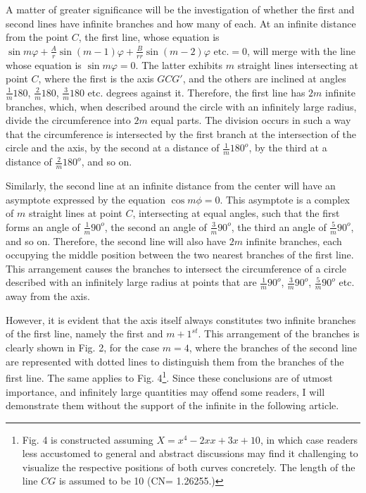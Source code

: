 \documentclass[12pt]{memoir}
\theoremstyle{plain}
\theoremstyle{remark}
\begin{document}
A matter of greater significance will be the investigation of whether the first and second lines have infinite branches and how many of each. At an infinite distance from the point \(C\), the first line, whose equation is \(\sin m \varphi + \frac{A}{r} \sin (m-1)\varphi + \frac{B}{rr} \sin (m-2) \varphi \text{ etc.} = 0\), will merge with the line whose equation is \(\sin m \varphi = 0\). The latter exhibits \(m\) straight lines intersecting at point \(C\), where the first is the axis \(GCG'\), and the others are inclined at angles \(\frac{1}{m} 180\), \(\frac{2}{m} 180\), \(\frac{3}{m} 180 \) etc. degrees against it. Therefore, the first line has \(2m\) infinite branches, which, when described around the circle with an infinitely large radius, divide the circumference into \(2m\) equal parts. The division occurs in such a way that the circumference is intersected by the first branch at the intersection of the circle and the axis, by the second at a distance of \(\frac{1}{m} 180^o\), by the third at a distance of \(\frac{2}{m} 180^o\), and so on.

Similarly, the second line at an infinite distance from the center will have an asymptote expressed by the equation \(\cos m \phi = 0\). This asymptote is a complex of \(m\) straight lines at point \(C\), intersecting at equal angles, such that the first forms an angle of \(\frac{1}{m}90^o\), the second an angle of \(\frac{3}{m}90^o\), the third an angle of \(\frac{5}{m}90^o\), and so on. Therefore, the second line will also have \(2m\) infinite branches, each occupying the middle position between the two nearest branches of the first line. This arrangement causes the branches to intersect the circumference of a circle described with an infinitely large radius at points that are \(\frac{1}{m}90^o\), \(\frac{3}{m}90^o\), \(\frac{5}{m}90^o\) etc. away from the axis.

However, it is evident that the axis itself always constitutes two infinite branches of the first line, namely the first and \({m+1}^{st}\). This arrangement of the branches is clearly shown in Fig. 2, for the case \(m = 4\), where the branches of the second line are represented with dotted lines to distinguish them from the branches of the first line. The same applies to Fig. 4\footnote{Fig. 4 is constructed assuming \(X = x^4 - 2xx + 3x + 10\), in which case readers less accustomed to general and abstract discussions may find it challenging to visualize the respective positions of both curves concretely. The length of the line \(CG\) is assumed to be 10 (CN= 1.26255.)}. Since these conclusions are of utmost importance, and infinitely large quantities may offend some readers, I will demonstrate them without the support of the infinite in the following article.
\end{document}
